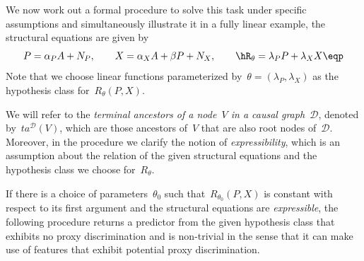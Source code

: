 We now work out a formal procedure to solve this task under specific assumptions
and simultaneously illustrate it in a fully linear example, \ie{} the structural
equations are given by
\begin{equation*}
  P = \alpha_P A + N_P, \qquad
  X = \alpha_X A + \beta P + N_X, \qquad
  \hR_{\theta} = \lambda_P P + \lambda_X X \eqp
\end{equation*}
Note that we choose linear functions parameterized by~$\theta = (\lambda_P,
\lambda_X)$ as the hypothesis class for~$R_{\theta}(P, X)$.

We will refer to the \emph{terminal ancestors of a node~$V$ in a causal
graph~$\mathcal{D}$}, denoted by~$ta^{\mathcal{D}}(V)$, which are those
ancestors of~$V$ that are also root nodes of~$\mathcal{D}$. Moreover, in the
procedure we clarify the notion of \emph{expressibility}, which is an assumption
about the relation of the given structural equations and the hypothesis class we
choose for~$R_{\theta}$.

\begin{proposition}\label{pro:proxydisc}
  If there is a choice of parameters~$\theta_0$ such that~$R_{\theta_0}(P,X)$ is
  constant with respect to its first argument and the structural equations are
  \emph{expressible}, the following procedure returns a predictor from the given
  hypothesis class that exhibits no proxy discrimination and is non-trivial in
  the sense that it can make use of features that exhibit potential proxy
  discrimination.
\end{proposition}

